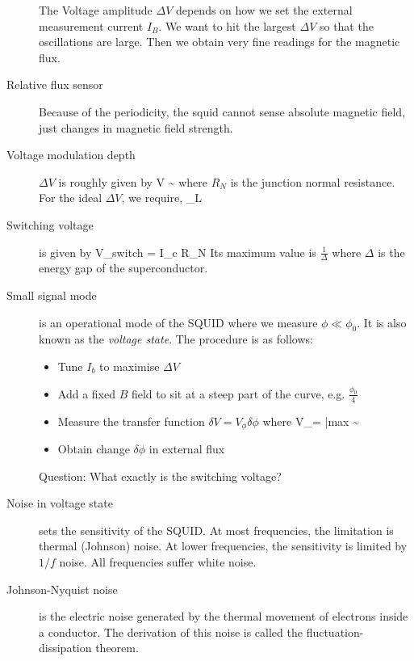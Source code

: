 \begin{description}
The Voltage amplitude $\Delta V$ depends on how we set the external measurement current $I_B$. We want to hit the largest $\Delta V$ so that the oscillations are large. Then we obtain very fine readings for the magnetic flux. 

\item[Relative flux sensor] Because of the periodicity, the squid cannot sense absolute magnetic field, just changes in magnetic field strength. 

\item[Voltage modulation depth] $\Delta V$ is roughly given by 
\beq
\Delta V \sim {}
\eeq
where $R_N$ is the junction normal resistance. For the ideal $\Delta V$, we require, 
\beq
\beta_L 
\eeq

\item[Switching voltage] is given by 
\beq
V_{switch} = I_c R_N
\eeq
Its maximum value is $\frac{1}{\Delta}$ where $\Delta$ is the energy gap of the superconductor. 

\item[Small signal mode] is an operational mode of the SQUID where we measure $\phi \ll \phi_0$. It is also known as the \emph{voltage state}. The procedure is as follows:
\begin{itemize}
\item Tune $I_b$ to maximise $\Delta V$
\item Add a fixed $B$ field to sit at a steep part of the curve, e.g. $\frac{\phi_0}{4}$
\item Measure the transfer function $\delta V = V_\phi \delta \phi$ where
\beq
V_\phi =  \bigg|{max} \sim {}
\eeq
\item Obtain change  $\delta \phi$ in external flux
\end{itemize}



Question: What exactly is the switching voltage? 



\item[Noise in voltage state] sets the sensitivity of the SQUID. At most frequencies, the limitation is thermal (Johnson) noise. At lower frequencies, the sensitivity is limited by $1/f$ noise. All frequencies suffer white noise. 

\item[Johnson-Nyquist noise] is the electric noise generated by the thermal movement of electrons inside a conductor. The derivation of this noise is called the fluctuation-dissipation theorem. 


\end{description}
